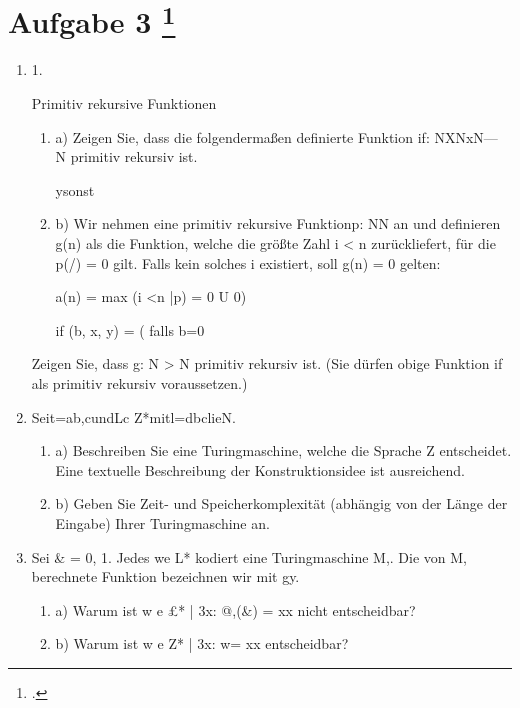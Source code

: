 \documentclass{lehramt-informatik-aufgabe}
\begin{document}
\section{Aufgabe 3
\index{}
\footcite{66115:2017:03}}

\begin{enumerate}

\item 1.

Primitiv rekursive Funktionen

\begin{enumerate}
\item a) Zeigen Sie, dass die folgendermaßen definierte Funktion if: NXNxN— N primitiv rekursiv
ist.

ysonst

\item b) Wir nehmen eine primitiv rekursive Funktionp: NN an und definieren g(n) als die
Funktion, welche die größte Zahl i < n zurückliefert, für die p(/) = 0 gilt. Falls kein solches i
existiert, soll g(n) = 0 gelten:

a(n) = max ({i <n |p) = 0} U {0})

if (b, x, y) = ( falls b=0
\end{enumerate}

Zeigen Sie, dass g: N > N primitiv rekursiv ist. (Sie dürfen obige Funktion if als primitiv rekursiv
voraussetzen.)

\item Seit={ab,c}undLc Z*mitl={dbclieN}.
\begin{enumerate}
\item a) Beschreiben Sie eine Turingmaschine, welche die Sprache Z entscheidet. Eine textuelle
Beschreibung der Konstruktionsidee ist ausreichend.

\item b) Geben Sie Zeit- und Speicherkomplexität (abhängig von der Länge der Eingabe) Ihrer
Turingmaschine an.
\end{enumerate}

\item Sei \& = {0, 1}. Jedes we L* kodiert eine Turingmaschine M,. Die von M, berechnete Funktion
bezeichnen wir mit gy.

\begin{enumerate}
\item a) Warum ist {w e £* | 3x: @,(\&) = xx} nicht entscheidbar?
\item b) Warum ist {w e Z* | 3x: w= xx} entscheidbar?

\end{enumerate}
\end{enumerate}
\end{document}
